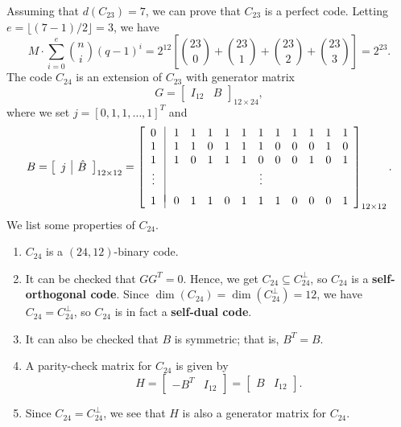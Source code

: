 \documentclass[10pt]{article}
\theoremstyle{newstyle}
\begin{document}
Assuming that $d(C_{23}) = 7$, we can prove that $C_{23}$ is a perfect code. 
Letting $e = \lfloor (7-1)/2 \rfloor = 3$, we have 
\[ M \cdot \sum_{i=0}^e \binom ni (q-1)^i = 2^{12} \left[ \binom {23}0 + 
\binom{23}1 + \binom{23}2 + \binom{23}3 \right] = 2^{23}. \]
The code $C_{24}$ is an extension of $C_{23}$ with generator matrix 
\[ G = \left[
\begin{array}{c|c}
I_{12} & B
\end{array}
\right]_{12 \times 24}, \]
where we set $j = [0, 1, 1, \dots, 1]^T$ and 
\[ B = \left[
\begin{array}{c|c}
j & \hat B
\end{array}
\right]_{12 \times 12} 
= 
\left[ 
\begin{array}{c|ccccccccccc}
0 \;&\; 1 & 1 & 1 & 1 & 1 & 1 & 1 & 1 & 1 & 1 & 1 \\
1 \;&\; 1 & 1 & 0 & 1 & 1 & 1 & 0 & 0 & 0 & 1 & 0 \\
1 \;&\; 1 & 0 & 1 & 1 & 1 & 0 & 0 & 0 & 1 & 0 & 1 \\
\vdots  \;&\;   &   &   &   &  & \vdots & & & & \\
\vspace{-1.5ex} \\ 
1 \;&\; 0 & 1 & 1 & 0 & 1 & 1 & 1 & 0 & 0 & 0 & 1
\end{array} \right]_{12 \times 12}. \]
We list some properties of $C_{24}$. 
\begin{enumerate}[(1)]
    \item $C_{24}$ is a $(24, 12)$-binary code.
    \item It can be checked that $GG^T = 0$. Hence, we get $C_{24} \subseteq C_{24}^\perp$, 
    so $C_{24}$ is a {\bf self-orthogonal code}. Since $\dim(C_{24}) = \dim(C_{24}^\perp) = 12$, 
    we have $C_{24} = C_{24}^\perp$, so $C_{24}$ is in fact a {\bf self-dual code}. 
    \item It can also be checked that $B$ is symmetric; that is, $B^T = B$. 
    \item A parity-check matrix for $C_{24}$ is given by 
    \[ H = \left[ \begin{array}{c|c}
-B^T & I_{12}
\end{array} \right] = \left[ \begin{array}{c|c}
B & I_{12}
\end{array} \right]. \]
    \item Since $C_{24} = C_{24}^\perp$, we see that $H$ is also a generator matrix for $C_{24}$. 
\end{enumerate}
\end{document}
